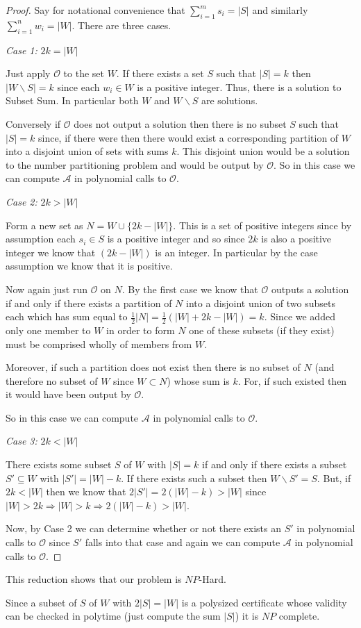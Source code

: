 \documentclass{article}
\begin{document}
\begin{proof}
Say for notational convenience that $\sum_{i=1}^m s_i = |S|$ and similarly $\sum_{i=1}^n w_i = |W|$. There are three cases.

\emph{Case 1: }$2k = |W|$

Just apply $\mathcal{O}$ to the set $W$. If there exists a set $S$ such that $|S|=k$ then $|W \backslash S|=k$ since each $w_i \in W$ is a positive integer. Thus, there is a solution to Subset Sum. In particular both $W$ and $W \backslash S$ are solutions.

Conversely if $\mathcal{O}$ does not output a solution then there is no subset $S$ such that $|S|=k$ since, if there were then there would exist a corresponding partition of $W$ into a disjoint union of sets with sums $k$. This disjoint union would be a solution to the number partitioning problem and would be output by $\mathcal{O}$. So in this case we can compute $\mathcal{A}$ in polynomial calls to $\mathcal{O}$.

\emph{Case 2: }$2k > |W|$

Form a new set as $N= W \cup \{ 2k -|W|\}$. This is a set of positive integers since by assumption each $s_i \in S$ is a positive integer and so since $2k$ is also a positive integer we know that $(2k - |W|)$ is an integer. In particular by the case assumption we know that it is positive.

Now again just run $\mathcal{O}$ on $N$. By the first case we know that $\mathcal{O}$ outputs a solution if and only if there exists a partition of $N$ into a disjoint union of two subsets each which has sum equal to $\frac{1}{2}|N|=\frac{1}{2}( |W|+ 2k - |W|) = k$. Since we added only one member to $W$ in order to form $N$ one of these subsets (if they exist) must be comprised wholly of members from $W$. 

Moreover, if such a partition does not exist then there is no subset of $N$ (and therefore no subset of $W$ since $W \subset N$) whose sum is $k$. For, if such existed then it would have been output by $\mathcal{O}$.

So in this case we can compute $\mathcal{A}$ in polynomial calls to $\mathcal{O}$.

\emph{Case 3: }$2k < |W|$

There exists some subset $S$ of $W$ with $|S|=k$ if and only if there exists a subset $S' \subseteq W$ with $|S'|=|W|-k$. If there exists such a subset then $W \backslash S' = S$. But, if $2k < |W|$ then we know that $2 |S'| = 2( |W| - k ) > |W|  $ since $|W| > 2k \Rightarrow |W| > k \Rightarrow 2( |W| - k ) > |W|  $.

Now, by Case 2 we can determine whether or not there exists an $S'$ in polynomial calls to $\mathcal{O}$ since $S'$ falls into that case and again  we can compute $\mathcal{A}$ in polynomial calls to $\mathcal{O}$.
\end{proof}

This reduction shows that our problem is $NP$-Hard.

Since a subset of $S$ of $W$ with $2 |S| = |W|$ is a polysized certificate whose validity can be checked in polytime (just compute the sum $|S|$) it is $NP$ complete.
\end{document}
